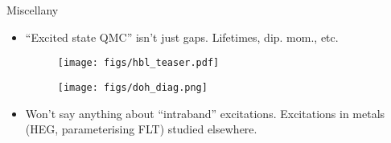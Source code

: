 \documentclass[10pt, pdf, hyperref={draft}, usenames, dvipsnames]{beamer}
\begin{document}
\begin{frame}{Miscellany}
\begin{itemize}

  \item ``Excited state QMC'' isn't just gaps. Lifetimes, dip. mom.,
  etc.

  \begin{minipage}[t]{0.20\textwidth}

  \begin{figure}[H]
    \centering
    \texttt{[image: figs/hbl\_teaser.pdf]}
  \end{figure}

  \end{minipage}%
  \hfill
  \begin{minipage}[t]{0.65\textwidth}

  \begin{figure}[H]
    \centering
    \texttt{[image: figs/doh\_diag.png]}
  \end{figure}

  \end{minipage}%

  \item Won't say anything about ``intraband'' excitations. Excitations in
  metals (HEG, parameterising FLT) studied
  elsewhere.


\end{itemize}
\end{frame}
\end{document}
